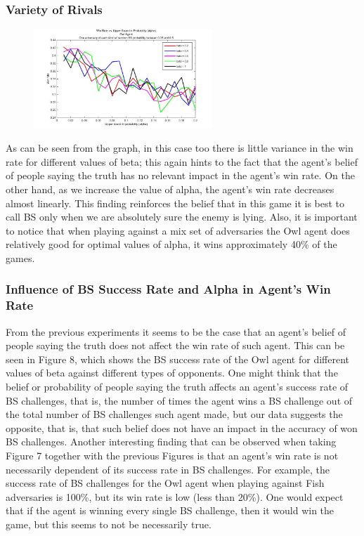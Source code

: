 \documentclass[a4paper,11pt]{article}
\begin{document}
\subsubsection{Variety of Rivals}

\begin{figure}
\includegraphics[width=0.6\textwidth]{owl_vs_all_winRate}
\caption{}
\end{figure}

As can be seen from the graph, in this case too there is little variance in the win rate for different values of beta;  this again hints to the fact that the agent’s belief of people saying the truth has no relevant impact in the agent’s win rate. On the other hand, as we increase the value of alpha, the agent’s win rate decreases almost linearly. This finding reinforces the belief that in this game it is best to call BS only when we are absolutely sure the enemy is lying. Also, it is important to notice that when playing against a mix set of adversaries the Owl agent does relatively good for optimal values of alpha, it wins approximately 40\% of the games. 

\subsubsection{Influence of BS Success Rate and Alpha in Agent's Win Rate}
From the previous experiments it seems to be the case that an agent’s belief of people saying the truth does not affect the win rate of such agent. This can be seen in Figure 8, which shows the BS success rate of the Owl agent for different values of beta against different types of opponents. One might think that the belief or probability of people saying the truth affects an agent’s  success rate of BS challenges, that is, the number of times the agent wins a BS challenge out of the total number of BS challenges such agent made, but our data suggests the opposite, that is, that such belief does not have an impact in the accuracy of won BS challenges. Another interesting finding that can be observed when taking Figure 7 together with the previous Figures is that an agent’s win rate is not necessarily dependent of its success rate in BS challenges. For example, the success rate of BS challenges for the Owl agent when playing against Fish adversaries is 100\%, but its win rate is low (less than 20\%). One would expect that if the agent is winning every single BS challenge, then it would win the game, but this seems to not be necessarily true.
\end{document}
